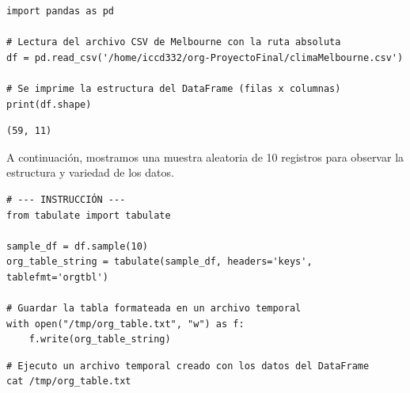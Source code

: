 \documentclass[11pt]{article}
\begin{document}
\begin{verbatim}
import pandas as pd

# Lectura del archivo CSV de Melbourne con la ruta absoluta
df = pd.read_csv('/home/iccd332/org-ProyectoFinal/climaMelbourne.csv')

# Se imprime la estructura del DataFrame (filas x columnas)
print(df.shape)
\end{verbatim}

\begin{verbatim}
(59, 11)
\end{verbatim}


A continuación, mostramos una muestra aleatoria de 10 registros para observar la estructura y variedad de los datos.

\begin{verbatim}
# --- INSTRUCCIÓN ---
from tabulate import tabulate

sample_df = df.sample(10)
org_table_string = tabulate(sample_df, headers='keys', tablefmt='orgtbl')

# Guardar la tabla formateada en un archivo temporal
with open("/tmp/org_table.txt", "w") as f:
    f.write(org_table_string)
\end{verbatim}


\begin{verbatim}
# Ejecuto un archivo temporal creado con los datos del DataFrame
cat /tmp/org_table.txt
\end{verbatim}
\end{document}
